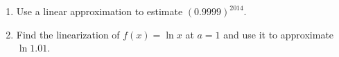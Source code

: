 \begin{enumerate}

\item \label{problem-linearization-estimate0.9999power2014} Use a linear approximation to estimate $(0.9999)^{2014}$. 


\item Find the linearization of $f(x)=\ln x$ at $a=1$ and use it to approximate $\ln 1.01$.

\end{enumerate}